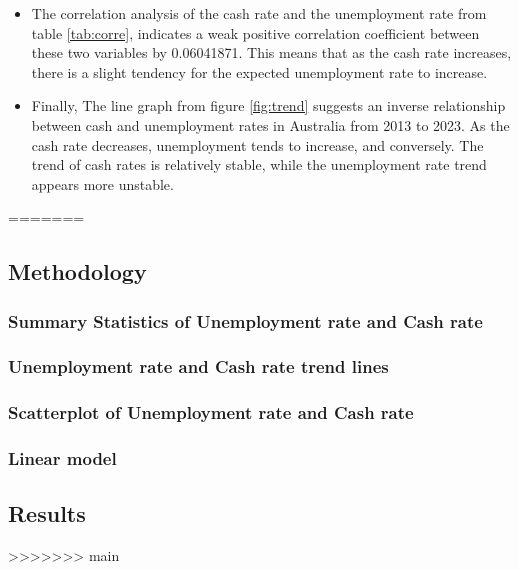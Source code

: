 \documentclass[11pt,a4paper,]{article}
\providecommand{\tightlist}{%
  \setlength{\itemsep}{0pt}\setlength{\parskip}{0pt}}
\begin{document}
\begin{itemize}
\tightlist
\item
  The correlation analysis of the cash rate and the unemployment rate from table \ref{tab:corre}, indicates a weak positive correlation coefficient between these two variables by 0.06041871. This means that as the cash rate increases, there is a slight tendency for the expected unemployment rate to increase.
\item
  Finally, The line graph from figure \ref{fig:trend} suggests an inverse relationship between cash and unemployment rates in Australia from 2013 to 2023. As the cash rate decreases, unemployment tends to increase, and conversely. The trend of cash rates is relatively stable, while the unemployment rate trend appears more unstable.
\end{itemize}
=======
\hypertarget{methodology-2}{%
\subsection{Methodology}\label{methodology-2}}

\hypertarget{summary-statistics-of-unemployment-rate-and-cash-rate}{%
\subsubsection{Summary Statistics of Unemployment rate and Cash rate}\label{summary-statistics-of-unemployment-rate-and-cash-rate}}

\hypertarget{unemployment-rate-and-cash-rate-trend-lines}{%
\subsubsection{Unemployment rate and Cash rate trend lines}\label{unemployment-rate-and-cash-rate-trend-lines}}

\hypertarget{scatterplot-of-unemployment-rate-and-cash-rate}{%
\subsubsection{Scatterplot of Unemployment rate and Cash rate}\label{scatterplot-of-unemployment-rate-and-cash-rate}}

\hypertarget{linear-model-2}{%
\subsubsection{Linear model}\label{linear-model-2}}

\hypertarget{results-2}{%
\subsection{Results}\label{results-2}}
>>>>>>> main
\end{document}
